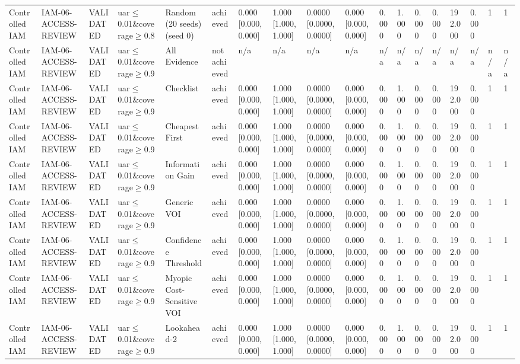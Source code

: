 \begin{table}[!ht]
{\begin{tabular}{llllllllllllllllll}
Controlled IAM & IAM-06-ACCESS-REVIEW & VALIDATED & uar$\le$0.01\&coverage$\ge$0.8 & Random (20 seeds) (seed 0) & achieved & 0.000 [0.000, 0.000] & 1.000 [1.000, 1.000] & 0.0000 [0.0000, 0.0000] & 0.000 [0.000, 0.000] & 0.000 & 1.000 & 0.000 & 0.000 & 192.000 & 0.000 & 1 & 1 \\
Controlled IAM & IAM-06-ACCESS-REVIEW & VALIDATED & uar$\le$0.01\&coverage$\ge$0.9 & All Evidence & not achieved & n/a & n/a & n/a & n/a & n/a & n/a & n/a & n/a & n/a & n/a & n/a & n/a \\
Controlled IAM & IAM-06-ACCESS-REVIEW & VALIDATED & uar$\le$0.01\&coverage$\ge$0.9 & Checklist & achieved & 0.000 [0.000, 0.000] & 1.000 [1.000, 1.000] & 0.0000 [0.0000, 0.0000] & 0.000 [0.000, 0.000] & 0.000 & 1.000 & 0.000 & 0.000 & 192.000 & 0.000 & 1 & 1 \\
Controlled IAM & IAM-06-ACCESS-REVIEW & VALIDATED & uar$\le$0.01\&coverage$\ge$0.9 & Cheapest First & achieved & 0.000 [0.000, 0.000] & 1.000 [1.000, 1.000] & 0.0000 [0.0000, 0.0000] & 0.000 [0.000, 0.000] & 0.000 & 1.000 & 0.000 & 0.000 & 192.000 & 0.000 & 1 & 1 \\
Controlled IAM & IAM-06-ACCESS-REVIEW & VALIDATED & uar$\le$0.01\&coverage$\ge$0.9 & Information Gain & achieved & 0.000 [0.000, 0.000] & 1.000 [1.000, 1.000] & 0.0000 [0.0000, 0.0000] & 0.000 [0.000, 0.000] & 0.000 & 1.000 & 0.000 & 0.000 & 192.000 & 0.000 & 1 & 1 \\
Controlled IAM & IAM-06-ACCESS-REVIEW & VALIDATED & uar$\le$0.01\&coverage$\ge$0.9 & Generic VOI & achieved & 0.000 [0.000, 0.000] & 1.000 [1.000, 1.000] & 0.0000 [0.0000, 0.0000] & 0.000 [0.000, 0.000] & 0.000 & 1.000 & 0.000 & 0.000 & 192.000 & 0.000 & 1 & 1 \\
Controlled IAM & IAM-06-ACCESS-REVIEW & VALIDATED & uar$\le$0.01\&coverage$\ge$0.9 & Confidence Threshold & achieved & 0.000 [0.000, 0.000] & 1.000 [1.000, 1.000] & 0.0000 [0.0000, 0.0000] & 0.000 [0.000, 0.000] & 0.000 & 1.000 & 0.000 & 0.000 & 192.000 & 0.000 & 1 & 1 \\
Controlled IAM & IAM-06-ACCESS-REVIEW & VALIDATED & uar$\le$0.01\&coverage$\ge$0.9 & Myopic Cost-Sensitive VOI & achieved & 0.000 [0.000, 0.000] & 1.000 [1.000, 1.000] & 0.0000 [0.0000, 0.0000] & 0.000 [0.000, 0.000] & 0.000 & 1.000 & 0.000 & 0.000 & 192.000 & 0.000 & 1 & 1 \\
Controlled IAM & IAM-06-ACCESS-REVIEW & VALIDATED & uar$\le$0.01\&coverage$\ge$0.9 & Lookahead-2 & achieved & 0.000 [0.000, 0.000] & 1.000 [1.000, 1.000] & 0.0000 [0.0000, 0.0000] & 0.000 [0.000, 0.000] & 0.000 & 1.000 & 0.000 & 0.000 & 192.000 & 0.000 & 1 & 1 \\

\end{tabular}}
\end{table}
